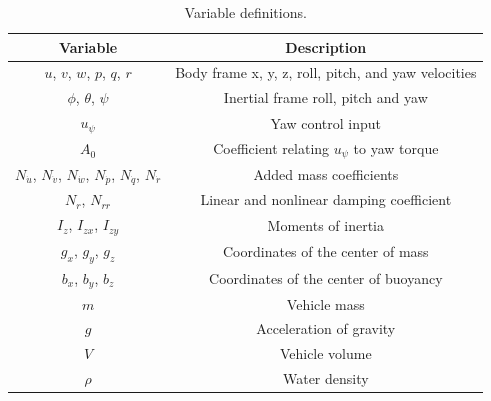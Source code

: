 \documentclass[applsci,article,submit,pdftex,moreauthors]{Definitions/mdpi}
\begin{document}
\begin{table}[h]
  \begin{center}
    \begin{tabular}{|c|c| } 
      \hline
      Variable & Description \\
      \hline
      $u$, $v$, $w$, $p$, $q$, $r$ & Body frame x, y, z, roll, pitch, and yaw velocities  \\
      \hline
      $\phi$, $\theta$, $\psi$ & Inertial frame roll, pitch and yaw\\
      \hline
      $u_\psi$ & Yaw control input \\
      \hline
      $A_0$ & Coefficient relating $u_\psi$ to yaw torque\\
      \hline         
      $N_{\dot{u}}$, $N_{\dot{v}}$, $N_{\dot{w}}$, $N_{\dot{p}}$, $N_{\dot{q}}$, $N_{\dot{r}}$ & Added mass coefficients \\
      \hline
      $N_r$, $N_{rr}$ & Linear and nonlinear damping coefficient \\
      \hline
      $I_z$, $I_{zx}$, $I_{zy}$ & Moments of inertia\\
      \hline
      $g_x$, $g_y$, $g_z$ & Coordinates of the center of mass\\
      \hline
      $b_x$, $b_y$, $b_z$ & Coordinates of the center of buoyancy\\
      \hline
      $m$ & Vehicle mass\\
      \hline
      $g$ & Acceleration of gravity\\
      \hline
      $V$ & Vehicle volume\\
      \hline
      $\rho$ & Water density\\
      \hline      
    \end{tabular}
  \end{center}
  \caption{\label{tab:variables}Variable definitions.}
\end{table}
\end{document}
